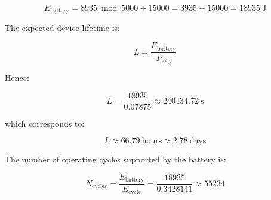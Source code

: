 \documentclass{article}
\begin{document}
\[
E_{\text{battery}} = 8935 \bmod 5000 + 15000 = 3935 + 15000 = 18935\ \text{J}
\]

The expected device lifetime is:

\[
L = \frac{E_{\text{battery}}}{P_{\text{avg}}}
\]

Hence:

\[
L = \frac{18935}{0.07875} \approx 240434.72\ \text{s}
\]

which corresponds to:

\[
L \approx 66.79\ \text{hours} \approx 2.78\ \text{days}
\]

The number of operating cycles supported by the battery is:

\[
N_{\text{cycles}} = \frac{E_{\text{battery}}}{E_{\text{cycle}}}
= \frac{18935}{0.3428141}
\approx 55234
\]



 


 
\end{document}
